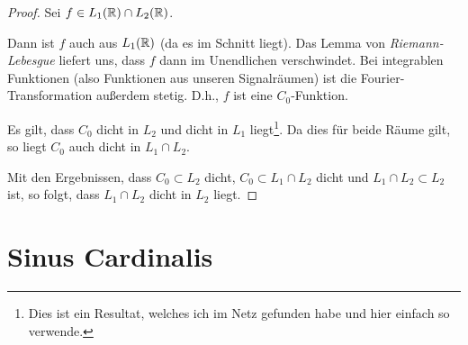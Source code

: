 \begin{proof}
Sei $f\in L_1(\mathbb{R}) \cap L_2(\mathbb{R})$.

Dann ist $f$ auch aus $L_1(\mathbb{R})$ (da es im Schnitt liegt). Das Lemma von
\emph{Riemann-Lebesgue} liefert uns, dass $f$ dann im Unendlichen verschwindet. Bei
integrablen Funktionen (also Funktionen aus unseren Signalräumen) ist die Fourier-Transformation
außerdem stetig. D.h., $f$ ist eine $C_0$-Funktion.

Es gilt, dass $C_0$ dicht in $L_2$ und dicht in $L_1$ liegt\footnote{Dies ist ein Resultat, welches
ich im Netz gefunden habe und hier einfach so verwende.}. Da dies für beide Räume gilt, so liegt
$C_0$ auch dicht in $L_1 \cap L_2$.

Mit den Ergebnissen, dass $C_0 \subset L_2$ dicht, $C_0 \subset L_1 \cap L_2$ dicht und 
$L_1 \cap L_2 \subset L_2$ ist, so folgt, dass $L_1 \cap L_2$ dicht in $L_2$ liegt.
\end{proof}

\section{Sinus Cardinalis}\label{sec:sincproofs}

